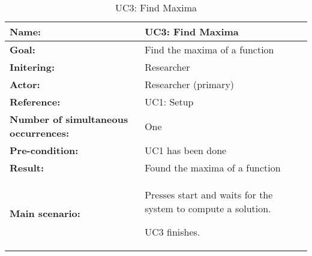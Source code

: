 \begin{table}[H]
	\begin{tabularx}{\textwidth}{| >{\raggedright\arraybackslash}p{3.3 cm} | >{\raggedright\arraybackslash}X |} \hline
		
		\textbf{Name:} 						& UC3: Find Maxima\\ \hline
		\textbf{Goal:}						& Find the maxima of a function \\ \hline
		\textbf{Initering:}					& Researcher \\ \hline
		\textbf{Actor:} 					& Researcher (primary) \\ \hline
		\textbf{Reference:} 				& UC1: Setup \\ \hline
		\textbf{Number of simultaneous occurrences:} & One \\ \hline
		\textbf{Pre-condition:} 				& UC1 has been done \\ \hline
		\textbf{Result:}					& Found the maxima of a function \\ \hline
		\textbf{Main scenario:}				& 		

		\begin{packed_enum}
	\item Presses start and waits for the system to compute a solution.
	\item UC3 finishes.
\end{packed_enum} \\ \hline
	\end{tabularx}
\caption{UC3: Find Maxima}
\label{tbl:uc3}
\end{table}